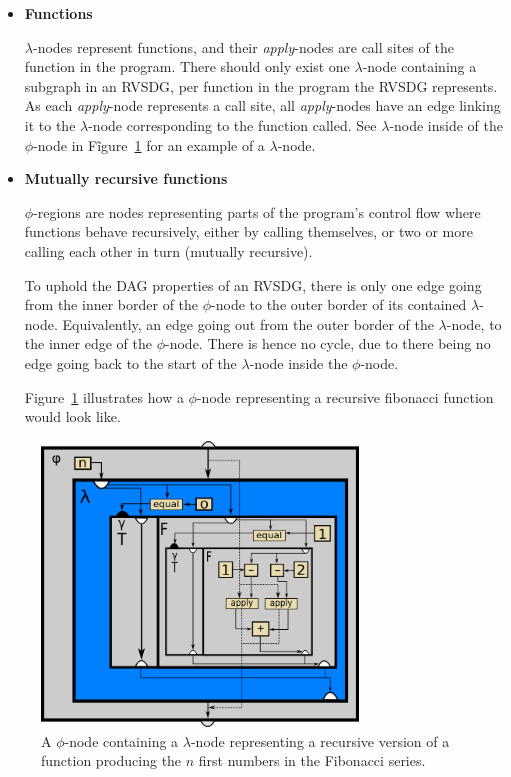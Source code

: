 \begin{itemize}
\item \textbf{Functions}

\textit{$\lambda$}-nodes represent functions, and their \textit{apply}-nodes are
call sites of the function in the program. There should only exist one
$\lambda$-node containing a subgraph in an RVSDG, per function in the program
the RVSDG represents. As each \textit{apply}-node represents a call site, all
\textit{apply}-nodes have an edge linking it to the $\lambda$-node corresponding
to the function called. See $\lambda$-node inside of the $\phi$-node in
Fĩgure~\ref{fig:rec_fib_phi} for an example of a $\lambda$-node.

\item \textbf{Mutually recursive functions}

\textit{$\phi$}-regions are nodes representing parts of the program's control
flow where functions behave recursively, either by calling themselves, or two or
more calling each other in turn (mutually recursive).

To uphold the DAG properties of an RVSDG, there is only one edge going from the
inner border of the $\phi$-node to the outer border of its contained
$\lambda$-node. Equivalently, an edge going out from the outer border of the
$\lambda$-node, to the inner edge of the $\phi$-node. There is hence no cycle,
due to there being no edge going back to the start of the $\lambda$-node inside
the $\phi$-node.

Figure~\ref{fig:rec_fib_phi} illustrates how a $\phi$-node representing a
recursive fibonacci function would look like.

\end{itemize}

\begin{figure}[h]
	\centering
	\includegraphics[width=0.75\textwidth]{figures/recursive_fibonacci}
	\caption{A $\phi$-node containing a $\lambda$-node representing a recursive
version of a function producing the $n$ first numbers in the Fibonacci series.}
	\label{fig:rec_fib_phi}
\end{figure}
